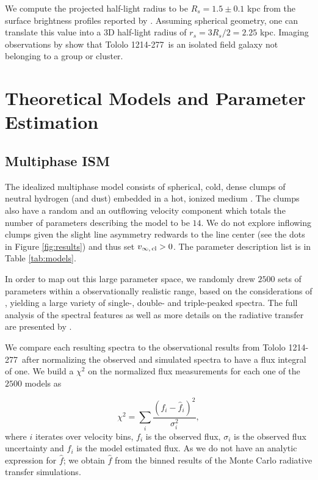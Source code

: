 \documentclass[a4,useAMS,usenatbib,usegraphicx]{mn2e}
\newcommand{\tol}{Tololo 1214-277}
\begin{document}
We compute the projected half-light radius to be $R_s=1.5\pm0.1$ kpc 
from the surface brightness profiles reported by \cite{2003A&A...410..481N}. 
Assuming spherical geometry, one can translate this value into a 3D
half-light radius of $r_s=3R_s/2=2.25$ kpc.
Imaging observations by \cite{2001AJ....121..169F} show that \tol\ is
an isolated field galaxy not belonging to a group or cluster. 






\section{Theoretical Models and Parameter Estimation}


\subsection{Multiphase ISM} 

The idealized multiphase model consists of spherical, cold, dense
clumps of neutral hydrogen (and dust) embedded in a hot, ionized
medium \citep{Gronke2016}. 
The clumps also have a random and an outflowing velocity
component which totals the number of parameters describing the model
to be $14$.
We do not explore inflowing clumps given the slight line asymmetry
redwards to the line center (see the dots in Figure \ref{fig:results})
and thus set $v_{\infty,\,{\rm cl}}>0$.
The parameter description list is in Table \ref{tab:models}.


In order to map out this large parameter space, we randomly drew
$2500$ sets of parameters within a observationally realistic range,
based on the considerations of \citet{Laursen2013ApJ...766..124L}, 
yielding a large variety of single-, double- and triple-peaked
spectra. 
The full analysis of the spectral features as well as
more details on the radiative transfer are presented by
\citet{Gronke2016}.    

We compare each resulting spectra to the observational results from
\tol\ after normalizing the observed and simulated spectra to have a 
flux integral of one.
We build a $\chi^2$ on the normalized flux measurements for each one
of the $2500$ models as

\begin{equation}
\chi^2 = \sum_{i} \frac{({f}_i - \hat{f}_i)^2}{\sigma_i^2}, 
\label{eq:chi2}
\end{equation}
%
where $i$ iterates over velocity bins, $f_{i}$ is the observed flux,
$\sigma_i$ is the observed flux uncertainty and $\hat{f}_i$ is the
model estimated flux.
As we do not have an analytic expression for $\hat{f}$;
we obtain $\hat{f}$ from the binned results of the Monte Carlo radiative transfer simulations.
\end{document}
